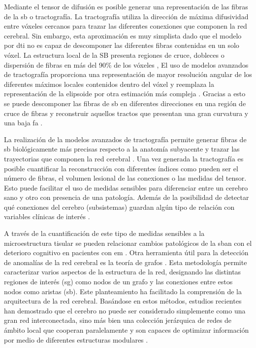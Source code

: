 Mediante el tensor de difusión es posible generar una representación de las fibras de la \gls{sb} o tractografía. La tractografía utiliza la dirección de máxima difusividad entre vóxeles cercanos para trazar las diferentes conexiones que componen la red cerebral. Sin embargo, esta aproximación es muy simplista dado que el modelo por \gls{dti} no es capaz de descomponer las diferentes fibras contenidas en un solo vóxel. La estructura local de la SB presenta regiones de cruce, dobleces o dispersión de fibras en más del 90\% de los vóxeles \cite{Jeurissen2013InvestigatingImaging}, El uso de modelos avanzados de tractografía proporciona una representación de mayor resolución angular de los diferentes máximos locales contenidos dentro del vóxel y reemplaza la representación de la elipsoide por otra estimación más compleja \cite{Tuch2002HighHeterogeneity}. Gracias a esto se puede descomponer las fibras de \gls{sb} en diferentes direcciones en una región de cruce de fibras y reconstruir aquellos tractos que presentan una gran curvatura y una baja \gls{fa} \cite{Martinez-Heras2015ImprovedRadiation}.  

La realización de la modelos avanzados de tractografía permite generar fibras de \gls{sb} biológicamente más precisas respecto a la anatomía subyacente y trazar las trayectorias que componen la red cerebral \cite{Rubinov2010ComplexInterpretations}. Una vez generada la  tractografía es posible cuantificar la reconstrucción con diferentes índices como pueden ser el número de fibras, el volumen lesional de las conexiones o las medidas del tensor. Esto puede facilitar el uso de medidas sensibles para diferenciar entre un cerebro sano y otro con presencia de una patología. Además de la posibilidad de detectar qué conexiones del cerebro (subsistemas) guardan algún tipo de relación con variables clínicas de interés \cite{Llufriu2017StructuralSclerosis}. 

A través de la cuantificación de este tipo de medidas sensibles a la microestructura tisular se pueden relacionar cambios patológicos de la \gls{sban} con el deterioro cognitivo en pacientes con \gls{em} \cite{Gabilondo2014Trans-synapticSclerosis} \cite{Llufriu2017StructuralSclerosis}. Otra herramienta útil para la detección de anomalías de la red cerebral es la teoría de grafos \cite{Bullmore2009ComplexSystems}. Esta metodología permite caracterizar varios aspectos de la estructura de la red, designando las distintas regiones de interés (\gls{sg}) como nodos de un grafo y las conexiones entre estos nodos como aristas (\gls{sb}). Este planteamiento ha facilitado la comprensión de la arquitectura de la red cerebral. Basándose en estos métodos, estudios recientes han demostrado que el cerebro no puede ser considerado simplemente como una gran red interconectada, sino más bien una colección jerárquica de redes de ámbito local que cooperan paralelamente y son capaces de optimizar información por medio de diferentes estructuras modulares \cite{Sporns2011NetworksBrain}. 

